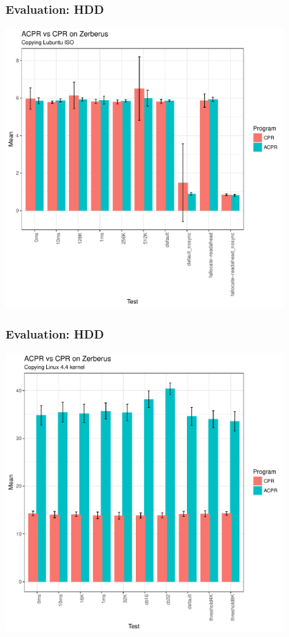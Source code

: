 \documentclass{beamer}
\begin{document}
\begin{frame}
    \frametitle{Evaluation: HDD}
    \centering
    \includegraphics[width=0.8\textwidth,height=0.8\textheight,]{CSRES_Lubuntu_Barplot.pdf}
\end{frame}

\begin{frame}
    \frametitle{Evaluation: HDD}
    \centering
    \includegraphics[width=0.8\textwidth,height=0.8\textheight,]{CSRES_Linux_Barplot.pdf}
\end{frame}
\end{document}
